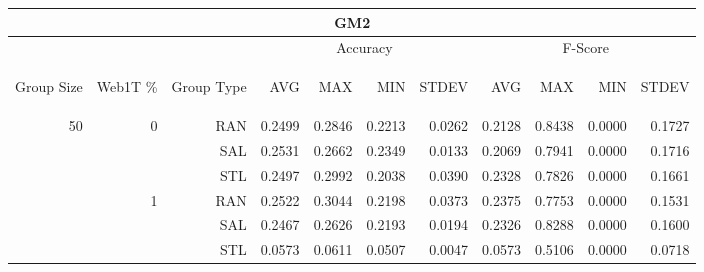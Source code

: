 \begin{center}
\begin{table}[htbp]
\begin{tabular}{ | r | r | r | r | r | r | r | r | r | r | r |}
\hline
\multicolumn{11}{|c|}{GM2}\\
\hline
 & & & \multicolumn{4}{|c|}{Accuracy} & \multicolumn{4}{|c|}{F-Score}\\ \cline{4-11}
\begin{sideways}Group Size\end{sideways} & \begin{sideways}Web1T \%\end{sideways} & \begin{sideways}Group Type\end{sideways} & \begin{sideways}AVG\end{sideways} & \begin{sideways}MAX\end{sideways} & \begin{sideways}MIN\end{sideways} & \begin{sideways}STDEV\end{sideways} & \begin{sideways}AVG\end{sideways} & \begin{sideways}MAX\end{sideways} & \begin{sideways}MIN\end{sideways} & \begin{sideways}STDEV\end{sideways}\\
\hline
\multirow{18}{*}{50}
 & \multirow{3}{*}{0} & RAN & 0.2499 & 0.2846 & 0.2213 & 0.0262 & 0.2128 & 0.8438 & 0.0000 & 0.1727\\ \cline{3-11}
 &   & SAL & 0.2531 & 0.2662 & 0.2349 & 0.0133 & 0.2069 & 0.7941 & 0.0000 & 0.1716\\ \cline{3-11}
 &   & STL & 0.2497 & 0.2992 & 0.2038 & 0.0390 & 0.2328 & 0.7826 & 0.0000 & 0.1661\\ \cline{2-11}
 & \multirow{3}{*}{1} & RAN & 0.2522 & 0.3044 & 0.2198 & 0.0373 & 0.2375 & 0.7753 & 0.0000 & 0.1531\\ \cline{3-11}
 &   & SAL & 0.2467 & 0.2626 & 0.2193 & 0.0194 & 0.2326 & 0.8288 & 0.0000 & 0.1600\\ \cline{3-11}
 &   & STL & 0.0573 & 0.0611 & 0.0507 & 0.0047 & 0.0573 & 0.5106 & 0.0000 & 0.0718\\ \cline{2-11}

\end{tabular}
\end{table}
\end{center}
